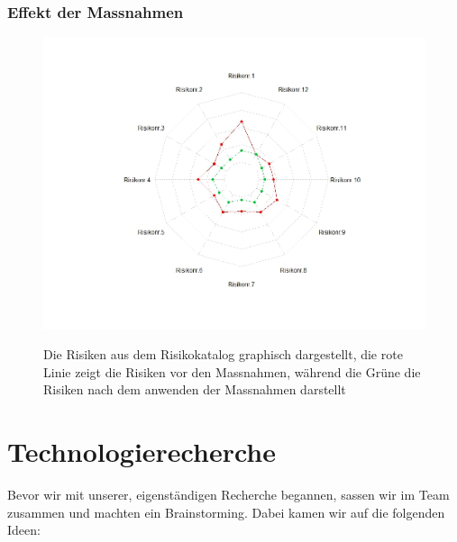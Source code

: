 \documentclass[a4paper]{report}
\begin{document}
\pagebreak
\subsection{Effekt der Massnahmen}

\begin{figure}[h!]
	\centering
	\includegraphics[width=.7\textwidth,keepaspectratio]{Risikomatrix_Spinne}
	\label{fig:Risikomatrix_Spinne}
	\caption{Die Risiken aus dem Risikokatalog graphisch dargestellt, die rote Linie zeigt die Risiken vor den Massnahmen, während die Grüne die Risiken nach dem anwenden der Massnahmen darstellt}
\end{figure}

\chapter{Technologierecherche}

Bevor wir mit unserer, eigenständigen Recherche begannen, sassen wir im Team zusammen und machten ein Brainstorming. Dabei kamen wir auf die folgenden Ideen:
\end{document}
